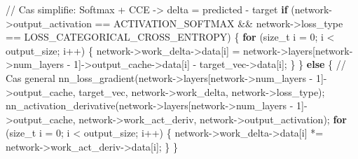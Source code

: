 \documentclass[
  letterpaper,
  DIV=11,
  numbers=noendperiod]{scrartcl}
\newenvironment{Shaded}{\begin{snugshade}}{\end{snugshade}}
\newcommand{\CommentTok}[1]{\textcolor[rgb]{0.37,0.37,0.37}{#1}}
\newcommand{\ControlFlowTok}[1]{\textcolor[rgb]{0.00,0.23,0.31}{\textbf{#1}}}
\newcommand{\DataTypeTok}[1]{\textcolor[rgb]{0.68,0.00,0.00}{#1}}
\newcommand{\DecValTok}[1]{\textcolor[rgb]{0.68,0.00,0.00}{#1}}
\newcommand{\NormalTok}[1]{\textcolor[rgb]{0.00,0.23,0.31}{#1}}
\newcommand{\OperatorTok}[1]{\textcolor[rgb]{0.37,0.37,0.37}{#1}}
\begin{document}
\begin{Shaded}
\begin{Highlighting}[]
    \CommentTok{// Cas simplifie: Softmax + CCE -> delta = predicted - target}
    \ControlFlowTok{if} \OperatorTok{(}\NormalTok{network}\OperatorTok{{-}\textgreater{}}\NormalTok{output\_activation }\OperatorTok{==}\NormalTok{ ACTIVATION\_SOFTMAX }\OperatorTok{\&\&}
\NormalTok{        network}\OperatorTok{{-}\textgreater{}}\NormalTok{loss\_type }\OperatorTok{==}\NormalTok{ LOSS\_CATEGORICAL\_CROSS\_ENTROPY}\OperatorTok{)} \OperatorTok{\{}
        \ControlFlowTok{for} \OperatorTok{(}\DataTypeTok{size\_t}\NormalTok{ i }\OperatorTok{=} \DecValTok{0}\OperatorTok{;}\NormalTok{ i }\OperatorTok{\textless{}}\NormalTok{ output\_size}\OperatorTok{;}\NormalTok{ i}\OperatorTok{++)} \OperatorTok{\{}
\NormalTok{            network}\OperatorTok{{-}\textgreater{}}\NormalTok{work\_delta}\OperatorTok{{-}\textgreater{}}\NormalTok{data}\OperatorTok{[}\NormalTok{i}\OperatorTok{]} \OperatorTok{=}
\NormalTok{                network}\OperatorTok{{-}\textgreater{}}\NormalTok{layers}\OperatorTok{[}\NormalTok{network}\OperatorTok{{-}\textgreater{}}\NormalTok{num\_layers }\OperatorTok{{-}} \DecValTok{1}\OperatorTok{]{-}\textgreater{}}\NormalTok{output\_cache}\OperatorTok{{-}\textgreater{}}\NormalTok{data}\OperatorTok{[}\NormalTok{i}\OperatorTok{]}
                \OperatorTok{{-}}\NormalTok{ target\_vec}\OperatorTok{{-}\textgreater{}}\NormalTok{data}\OperatorTok{[}\NormalTok{i}\OperatorTok{];}
        \OperatorTok{\}}
    \OperatorTok{\}} \ControlFlowTok{else} \OperatorTok{\{}
        \CommentTok{// Cas general}
\NormalTok{        nn\_loss\_gradient}\OperatorTok{(}\NormalTok{network}\OperatorTok{{-}\textgreater{}}\NormalTok{layers}\OperatorTok{[}\NormalTok{network}\OperatorTok{{-}\textgreater{}}\NormalTok{num\_layers }\OperatorTok{{-}} \DecValTok{1}\OperatorTok{]{-}\textgreater{}}\NormalTok{output\_cache}\OperatorTok{,}
\NormalTok{                        target\_vec}\OperatorTok{,}\NormalTok{ network}\OperatorTok{{-}\textgreater{}}\NormalTok{work\_delta}\OperatorTok{,}\NormalTok{ network}\OperatorTok{{-}\textgreater{}}\NormalTok{loss\_type}\OperatorTok{);}
\NormalTok{        nn\_activation\_derivative}\OperatorTok{(}\NormalTok{network}\OperatorTok{{-}\textgreater{}}\NormalTok{layers}\OperatorTok{[}\NormalTok{network}\OperatorTok{{-}\textgreater{}}\NormalTok{num\_layers }\OperatorTok{{-}} \DecValTok{1}\OperatorTok{]{-}\textgreater{}}\NormalTok{output\_cache}\OperatorTok{,}
\NormalTok{                                network}\OperatorTok{{-}\textgreater{}}\NormalTok{work\_act\_deriv}\OperatorTok{,}\NormalTok{ network}\OperatorTok{{-}\textgreater{}}\NormalTok{output\_activation}\OperatorTok{);}
        \ControlFlowTok{for} \OperatorTok{(}\DataTypeTok{size\_t}\NormalTok{ i }\OperatorTok{=} \DecValTok{0}\OperatorTok{;}\NormalTok{ i }\OperatorTok{\textless{}}\NormalTok{ output\_size}\OperatorTok{;}\NormalTok{ i}\OperatorTok{++)} \OperatorTok{\{}
\NormalTok{            network}\OperatorTok{{-}\textgreater{}}\NormalTok{work\_delta}\OperatorTok{{-}\textgreater{}}\NormalTok{data}\OperatorTok{[}\NormalTok{i}\OperatorTok{]} \OperatorTok{*=}\NormalTok{ network}\OperatorTok{{-}\textgreater{}}\NormalTok{work\_act\_deriv}\OperatorTok{{-}\textgreater{}}\NormalTok{data}\OperatorTok{[}\NormalTok{i}\OperatorTok{];}
        \OperatorTok{\}}
    \OperatorTok{\}}


\end{Highlighting}
\end{Shaded}
\end{document}
